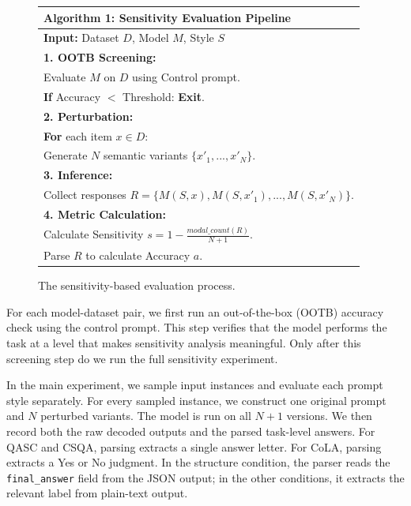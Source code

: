 \documentclass[11pt]{article}
\begin{document}
\begin{figure}[h]
\begin{minipage}{\columnwidth}
\begin{small}
\begin{tabular}{p{}}
\hline
\textbf{Algorithm 1:} Sensitivity Evaluation Pipeline \\ \hline
\textbf{Input:} Dataset $D$, Model $M$, Style $S$ \\
\textbf{1. OOTB Screening:} \\
\hspace{1em} Evaluate $M$ on $D$ using Control prompt. \\
\hspace{1em} \textbf{If} Accuracy $<$ Threshold: \textbf{Exit}. \\
\textbf{2. Perturbation:} \\
\hspace{1em} \textbf{For} each item $x \in D$: \\
\hspace{2em} Generate $N$ semantic variants $\{x'_1, ..., x'_N\}$. \\
\textbf{3. Inference:} \\
\hspace{1em} Collect responses $R = \{M(S, x), M(S, x'_1), ..., M(S, x'_N)\}$. \\
\textbf{4. Metric Calculation:} \\
\hspace{1em} Calculate Sensitivity $s = 1 - \frac{modal\_count(R)}{N+1}$. \\
\hspace{1em} Parse $R$ to calculate Accuracy $a$. \\ \hline
\end{tabular}
\end{small}
\caption{The sensitivity-based evaluation process.}
\label{alg:pipeline}
\end{minipage}
\end{figure}

For each model-dataset pair, we first run an out-of-the-box (OOTB) accuracy check using the control prompt. This step verifies that the model performs the task at a level that makes sensitivity analysis meaningful. Only after this screening step do we run the full sensitivity experiment.

In the main experiment, we sample input instances and evaluate each prompt style separately. For every sampled instance, we construct one original prompt and $N$ perturbed variants. The model is run on all $N+1$ versions. We then record both the raw decoded outputs and the parsed task-level answers. For QASC and CSQA, parsing extracts a single answer letter. For CoLA, parsing extracts a Yes or No judgment. In the structure condition, the parser reads the \texttt{final\_answer} field from the JSON output; in the other conditions, it extracts the relevant label from plain-text output.
\end{document}
